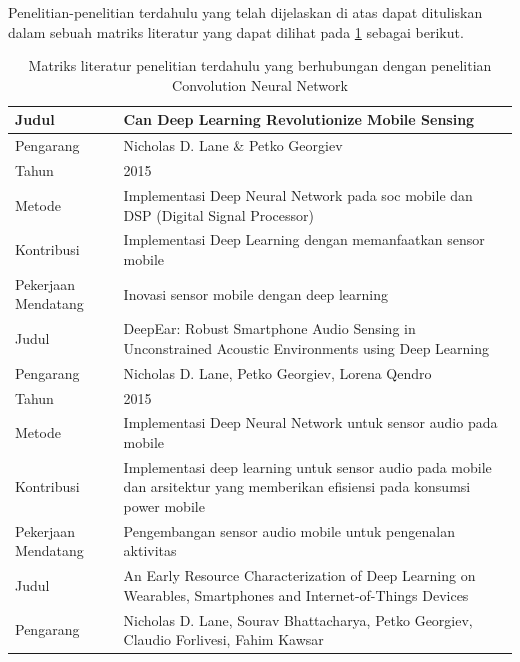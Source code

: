 Penelitian-penelitian terdahulu yang telah dijelaskan di atas dapat dituliskan dalam sebuah matriks literatur yang dapat dilihat pada \ref{tab:tab1} sebagai berikut.
\begin{table}
	\clearpage
	\centering
	\caption{Matriks literatur penelitian terdahulu yang berhubungan dengan penelitian Convolution Neural Network}
	\label{tab:tab1}
	\begin{tabular}{ |m{2cm}|m{7cm}|m{1cm}|m{1cm}| } 	
		\hline	
		Judul & \multicolumn{3}{|m{13cm}|}{Can Deep Learning Revolutionize Mobile Sensing} \\
		\hline
		Pengarang & \multicolumn{3}{|m{13cm}|}{Nicholas D. Lane \& Petko Georgiev} \\ 
		\hline
		Tahun & \multicolumn{3}{|m{13cm}|}{2015} \\ 
		\hline
		Metode & \multicolumn{3}{|m{13cm}|}{Implementasi Deep Neural Network pada soc mobile dan DSP (Digital Signal Processor)}\\
		\hline
		Kontribusi  & \multicolumn{3}{|m{13cm}|}{Implementasi Deep Learning dengan memanfaatkan sensor mobile}\\ 
		\hline
		Pekerjaan Mendatang  & \multicolumn{3}{|m{13cm}|}{Inovasi sensor mobile dengan deep learning} \\
		\hline\hline
		Judul & \multicolumn{3}{|m{13cm}|}{DeepEar: Robust Smartphone Audio Sensing in Unconstrained Acoustic Environments using Deep Learning} \\
		\hline
		Pengarang & \multicolumn{3}{|m{13cm}|}{Nicholas D. Lane, Petko Georgiev, Lorena Qendro} \\ 
		\hline
		Tahun & \multicolumn{3}{|m{13cm}|}{2015} \\ 
		\hline
		Metode & \multicolumn{3}{|m{13cm}|}{Implementasi Deep Neural Network untuk sensor audio pada mobile}\\
		\hline
		Kontribusi  & \multicolumn{3}{|m{13cm}|}{Implementasi deep learning untuk sensor audio pada mobile dan arsitektur yang memberikan efisiensi pada konsumsi power mobile}\\ 
		\hline
		Pekerjaan Mendatang  & \multicolumn{3}{|m{13cm}|}{Pengembangan sensor audio mobile untuk pengenalan aktivitas} \\
		\hline
		\hline\hline
		Judul & \multicolumn{3}{|m{13cm}|}{An Early Resource Characterization of Deep Learning on Wearables, Smartphones and Internet-of-Things Devices} \\
		\hline
		Pengarang & \multicolumn{3}{|m{13cm}|}{Nicholas D. Lane, Sourav Bhattacharya, Petko Georgiev, Claudio Forlivesi, Fahim Kawsar} \\ 

\end{tabular}
\end{table}
